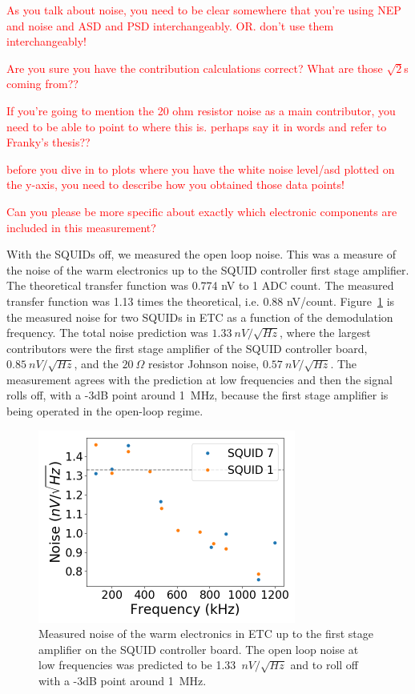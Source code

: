 \textcolor{red}{As you talk about noise, you need to be clear somewhere that you're using NEP and noise and ASD and PSD interchangeably. OR. don't use them interchangeably!}

\textcolor{red}{Are you sure you have the contribution calculations correct? What are those $\sqrt{2}$s coming from??}

\textcolor{red}{If you're going to mention the 20 ohm resistor noise as a main contributor, you need to be able to point to where this is. perhaps say it in words and refer to Franky's thesis??}

\textcolor{red}{before you dive in to plots where you have the white noise level/asd plotted on the y-axis, you need to describe how you obtained those data points!}

\textcolor{red}{Can you please be more specific about exactly which electronic components are included in this measurement?}

With the \ac{SQUID}s off, we measured the open loop noise.
This was a measure of the noise of the warm electronics up to the \ac{SQUID} controller first stage amplifier. 
The theoretical transfer function was 0.774 nV to 1 \ac{ADC} count. 
The measured transfer function was 1.13 times the theoretical, i.e. 0.88 nV/count. 
Figure~\ref{fig:dark_electronic_noise} is the measured noise for two \ac{SQUID}s in \ac{ETC} as a function of the demodulation frequency. 
The total noise prediction was $1.33~nV/\sqrt{Hz}$, where the largest contributors were the first stage amplifier of the \ac{SQUID} controller board, $0.85~nV/\sqrt{Hz}$, and the $20~\Omega$ resistor Johnson noise, $0.57~nV/\sqrt{Hz}$. 
The measurement agrees with the prediction at low frequencies and then the signal rolls off, with a -3dB point around 1~MHz, because the first stage amplifier is being operated in the open-loop regime.  

\begin{figure}[ht!]
\begin{center}
\includegraphics[height=2.5in]{figures/warm_electronic_noise.png}
\caption{Measured noise of the warm electronics in \ac{ETC} up to the first stage amplifier on the \ac{SQUID} controller board. The open loop noise at low frequencies was predicted to be 1.33~$nV/\sqrt{Hz}$ and to roll off with a -3dB point around 1~MHz. 
\label{fig:dark_electronic_noise} }
\end{center}
\end{figure}

